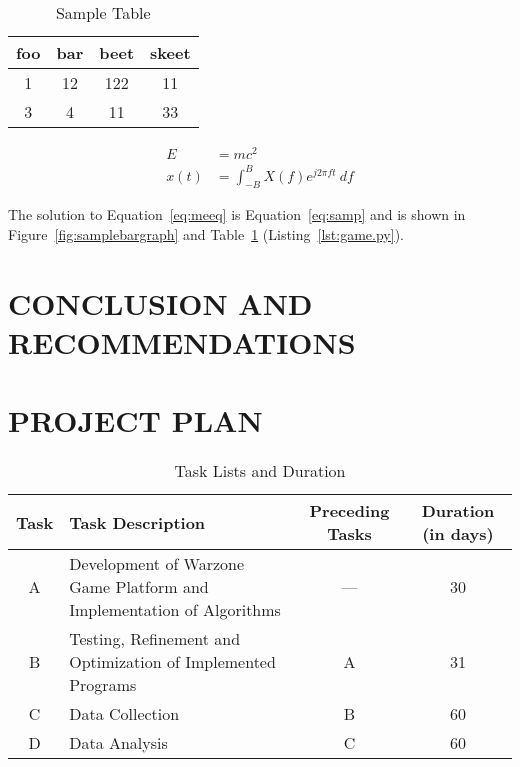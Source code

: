 \documentclass{strrespaper-trad}
\begin{document}
			\lipsum[15]

			\begin{table}[ht]
				\centering
				\caption[Sample Table]{Sample Table}
				\begin{tabular}{cccc}
					\toprule
					foo & bar & beet & skeet \\
					\midrule
					1   & 12  & 122  & 11    \\
					3   & 4   & 11   & 33    \\
					\bottomrule
				\end{tabular}
				\label{tab:sampletable}
			\end{table}

			\lipsum[14]

			\begin{align}
				E    & = mc^2 \label{eq:meeq}                                \\
				x(t) & = \int_{-B}^{B} X(f)e^{j 2\pi f t}~df \label{eq:samp}
			\end{align}

			The solution to Equation~\ref{eq:meeq} is Equation~\ref{eq:samp} and is shown in Figure~\ref{fig:samplebargraph} and Table~\ref{tab:sampletable} \autocite{al-shemmeriWindTurbines2010} (Listing~\ref{lst:game.py}).

	\section{CONCLUSION AND RECOMMENDATIONS}
		\lipsum[2-4]

	\literaturecited{}

	\appendix

	\section{PROJECT PLAN}
		\begin{table}[htbp]
			\centering
			\caption{Task Lists and Duration}
			\label{tab:task_lists_duration}
			\begin{tabularx}{\linewidth}{cXcc}
				\toprule
				Task & Task Description                                                      & Preceding Tasks & Duration (in days) \\
				\midrule
				A    & Development of Warzone Game Platform and Implementation of Algorithms & ---             & 30                 \\
				B    & Testing, Refinement and Optimization of Implemented Programs          & A               & 31                 \\
				C    & Data Collection                                                       & B               & 60                 \\
				D    & Data Analysis                                                         & C               & 60                 \\
				\bottomrule
			\end{tabularx}
		\end{table}
\end{document}
